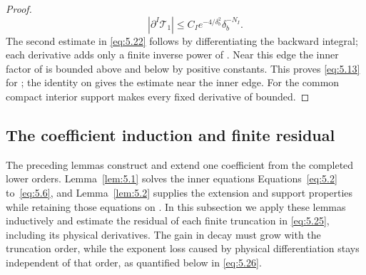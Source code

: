 \begin{proof}
\begin{equation}
\qquad
|\partial^I\mathcal T_1|\leq C_Ie^{-4/\delta_b^2}\delta_b^{-N_I}.
\tag{5.22}
\end{equation}
The second estimate in \eqref{eq:5.22} follows by differentiating the backward integral; each derivative adds only a finite
inverse power of . Near this edge the inner factor of  is bounded
above and below by positive constants. This proves \eqref{eq:5.13} for ; the identity
 on  gives the estimate near the inner edge. For
 the common compact interior support makes every fixed derivative of
 bounded.
\end{proof}

\subsection{The coefficient induction and finite residual}\label{sec:5.3}
The preceding lemmas construct and extend one coefficient from the completed lower orders. Lemma~\ref{lem:5.1} solves the
inner equations Equations~\eqref{eq:5.2} to~\eqref{eq:5.6}, and Lemma~\ref{lem:5.2} supplies the extension and support
properties while retaining those equations on . In this subsection we apply these lemmas
inductively and estimate the residual of each finite truncation in \eqref{eq:5.25}, including its physical derivatives. The gain
in decay must grow with the truncation order, while the exponent loss caused by physical differentiation stays independent
of that order, as quantified below in \eqref{eq:5.26}.
